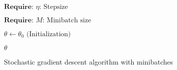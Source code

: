 
\begin{algorithm}[H]

 $\textbf{Require: } \eta\text{: Stepsize}$

 $\textbf{Require: } M \text{: Minibatch size}$

 $\theta \gets \theta_0 \text{ (Initialization)}$


 \Return $\theta$

 \caption{Stochastic gradient descent algorithm with minibatches}\label{alg:sbp}

\end{algorithm}
